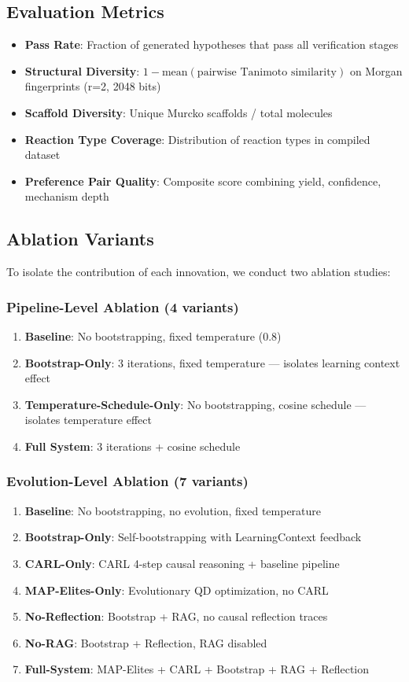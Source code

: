 \documentclass{article}
\begin{document}
\subsection{Evaluation Metrics}
\begin{itemize}
    \item \textbf{Pass Rate}: Fraction of generated hypotheses that pass all verification stages
    \item \textbf{Structural Diversity}: $1 - \text{mean}(\text{pairwise Tanimoto similarity})$ on Morgan fingerprints (r=2, 2048 bits)
    \item \textbf{Scaffold Diversity}: Unique Murcko scaffolds / total molecules
    \item \textbf{Reaction Type Coverage}: Distribution of reaction types in compiled dataset
    \item \textbf{Preference Pair Quality}: Composite score combining yield, confidence, mechanism depth
\end{itemize}

\subsection{Ablation Variants}
To isolate the contribution of each innovation, we conduct two ablation studies:
\subsubsection{Pipeline-Level Ablation (4 variants)}
\begin{enumerate}
    \item \textbf{Baseline}: No bootstrapping, fixed temperature (0.8)
    \item \textbf{Bootstrap-Only}: 3 iterations, fixed temperature — isolates learning context effect
    \item \textbf{Temperature-Schedule-Only}: No bootstrapping, cosine schedule — isolates temperature effect
    \item \textbf{Full System}: 3 iterations + cosine schedule
\end{enumerate}
\subsubsection{Evolution-Level Ablation (7 variants)}
\begin{enumerate}
    \item \textbf{Baseline}: No bootstrapping, no evolution, fixed temperature
    \item \textbf{Bootstrap-Only}: Self-bootstrapping with LearningContext feedback
    \item \textbf{CARL-Only}: CARL 4-step causal reasoning + baseline pipeline
    \item \textbf{MAP-Elites-Only}: Evolutionary QD optimization, no CARL
    \item \textbf{No-Reflection}: Bootstrap + RAG, no causal reflection traces
    \item \textbf{No-RAG}: Bootstrap + Reflection, RAG disabled
    \item \textbf{Full-System}: MAP-Elites + CARL + Bootstrap + RAG + Reflection
\end{enumerate}
\end{document}
